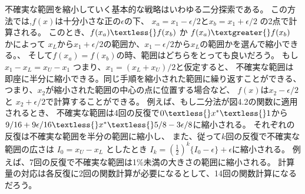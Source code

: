 不確実な範囲を縮小していく基本的な戦略はいわゆる二分探索である。
この方法では,$f(x)$は十分小さな正の$\epsilon$の下、
$x_a = x_1 - \epsilon / 2$と$x_b = x_1 +
\epsilon / 2$ の2点で計算される。 このとき、$ f(x_a)
\textless{} f(x_b) $ か $ f(x_a) \textgreater{} f(x_b) $
かによって $x_L$から$x_1 + \epsilon /2
$の範囲か、$x_1 - \epsilon /2
$から$x_L$の範囲かを選んで縮小できる。、 そして$f(x_a) =
f(x_b)$の時、範囲はどちらをとっても良いだろう。 もし$ x_1
- x_L = x_U - x_1 $ つまり、$ x_1 = (x_L + x_U)/2
$と仮定すると、
不確実な範囲は即座に半分に縮小できる。同じ手順を縮小された範囲に繰り返すことができる、
つまり、$x_2$が縮小された範囲の中心の点に位置する場合など、
$f(x)$は$x_2 - \epsilon / 2$ と $x_2 +
\epsilon / 2$で計算することができる。
例えば、もし二分法が図4.2の関数に適用されるとき、
不確実な範囲は4回の反復で$0 \textless{} x^{*} \textless{}
1$から$9/16 + 9 \epsilon / 16 \textless{} x^{*}
\textless{} 5/8 - 3 \epsilon / 8$に縮小される。
それぞれの反復は不確実な範囲を半分の範囲に縮小し、
また、従って$k$回の反復で不確実な範囲の広さは $I_0 = x_U - x_L $
としたとき $I_k = (\frac{1}{2})^{k}\{I_0 - \epsilon\} + \epsilon$に縮小される。
例えば、7回の反復で不確実な範囲は1\%未満の大きさの範囲に縮小される。
計算量の対応は各反復に2回の関数計算が必要になるとして、14回の関数計算になるだろう。
